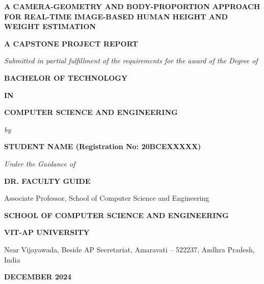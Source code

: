 \documentclass[12pt,a4paper,oneside]{report}
\begin{document}
\begin{titlepage}
\begin{center}
\vspace*{0.3cm}
{\Large\bfseries A CAMERA-GEOMETRY AND BODY-PROPORTION APPROACH FOR REAL-TIME IMAGE-BASED HUMAN HEIGHT AND WEIGHT ESTIMATION\par}
\vspace{1.0cm}
{\large\bfseries A CAPSTONE PROJECT REPORT\par}
\vspace{0.4cm}
{\normalsize\itshape Submitted in partial fulfillment of the requirements for the award of the Degree of\par}
\vspace{0.4cm}
{\large\bfseries BACHELOR OF TECHNOLOGY\par}
\vspace{0.2cm}
{\normalsize\bfseries IN\par}
\vspace{0.2cm}
{\large\bfseries COMPUTER SCIENCE AND ENGINEERING\par}
\vspace{0.9cm}
{\normalsize\itshape by\par}
\vspace{0.3cm}
{\large\bfseries STUDENT NAME (Registration No: 20BCEXXXXX)\par}
\vspace{1.0cm}
{\normalsize\itshape Under the Guidance of\par}
\vspace{0.3cm}
{\large\bfseries DR. FACULTY GUIDE\par}
{\normalsize Associate Professor, School of Computer Science and Engineering\par}
\vspace{1.2cm}

\begin{figure}[H]
\centering
{}
\end{figure}

\vspace{0.5cm}
{\bfseries\normalsize SCHOOL OF COMPUTER SCIENCE AND ENGINEERING\par}
{\bfseries\normalsize VIT-AP UNIVERSITY\par}
{\small Near Vijayawada, Beside AP Secretariat, Amaravati -- 522237, Andhra Pradesh, India\par}
\vspace{0.6cm}
{\large\bfseries DECEMBER 2024\par}
\end{center}
\end{titlepage}
\end{document}
